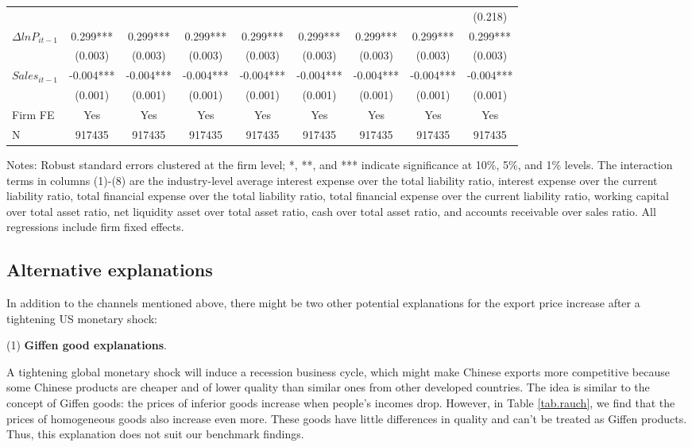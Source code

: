 \begin{table}[htbp]
{\begin{threeparttable}
\begin{tabular}{lcccccccc}
          &       &       &       &       &       &       &       & (0.218) \\
    $\Delta ln P_{it-1}$ & 0.299*** & 0.299*** & 0.299*** & 0.299*** & 0.299*** & 0.299*** & 0.299*** & 0.299*** \\
          & (0.003) & (0.003) & (0.003) & (0.003) & (0.003) & (0.003) & (0.003) & (0.003) \\
    $Sales_{it-1}$ & -0.004*** & -0.004*** & -0.004*** & -0.004*** & -0.004*** & -0.004*** & -0.004*** & -0.004*** \\
          & (0.001) & (0.001) & (0.001) & (0.001) & (0.001) & (0.001) & (0.001) & (0.001) \\
    \midrule
    Firm FE & Yes   & Yes   & Yes   & Yes   & Yes   & Yes   & Yes   & Yes \\
    N     & 917435 & 917435 & 917435 & 917435 & 917435 & 917435 & 917435 & 917435 \\
        \bottomrule
    \end{tabular}
        \begin{tablenotes}
            \footnotesize
            \item Notes: Robust standard errors clustered at the firm level;  *, **, and *** indicate significance at 10\%, 5\%, and 1\% levels. The interaction terms in columns (1)-(8) are the industry-level average interest expense over the total liability ratio, interest expense over the current liability ratio, total financial expense over the total liability ratio, total financial expense over the current liability ratio, working capital over total asset ratio, net liquidity asset over total asset ratio, cash over total asset ratio, and accounts receivable over sales ratio. All regressions include firm fixed effects.
	\end{tablenotes}
    \end{threeparttable}
    }
    \label{tab.non-linearity}
\end{table}

\subsection{Alternative explanations}

In addition to the channels mentioned above, there might be two other potential explanations for the export price increase after a tightening US monetary shock:

(1) \textbf{Giffen good explanations}. 

A tightening global monetary shock will induce a recession business cycle, which might make Chinese exports more competitive because some Chinese products are cheaper and of lower quality than similar ones from other developed countries. The idea is similar to the concept of Giffen goods: the prices of inferior goods increase when people's incomes drop. However, in Table \ref{tab.rauch}, we find that the prices of homogeneous goods also increase even more. These goods have little differences in quality and can't be treated as Giffen products. Thus, this explanation does not suit our benchmark findings.

